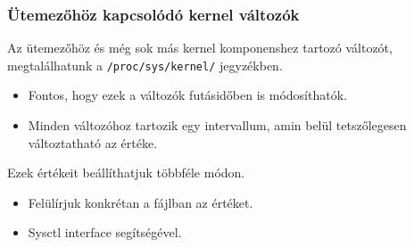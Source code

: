 \documentclass{beamer}
\begin{document}
\begin{frame}
\frametitle{ Ütemezőhöz kapcsolódó kernel változók}
Az ütemezőhöz és még sok más kernel komponenshez tartozó változót, megtalálhatunk a \texttt{/proc/sys/kernel/} jegyzékben.
\begin{itemize}
\item Fontos, hogy ezek a változók futásidőben is módosíthatók.
\item Minden változóhoz tartozik egy intervallum, amin belül tetszőlegesen változtatható az értéke. 
\end{itemize}

\bigskip

Ezek értékeit beállíthatjuk többféle módon.
\begin{itemize}
\item Felülírjuk konkrétan a fájlban az értéket.
\item Sysctl interface segítségével.
\end{itemize}

\end{frame}
\end{document}

